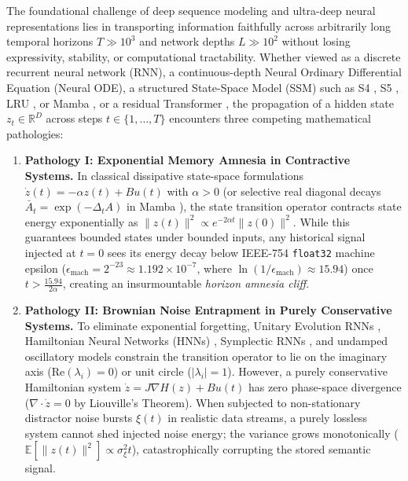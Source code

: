 \documentclass[11pt,a4paper]{article}
\begin{document}
The foundational challenge of deep sequence modeling and ultra-deep neural representations lies in transporting information faithfully across arbitrarily long temporal horizons $T \gg 10^3$ and network depths $L \gg 10^2$ without losing expressivity, stability, or computational tractability. Whether viewed as a discrete recurrent neural network (RNN), a continuous-depth Neural Ordinary Differential Equation (Neural ODE), a structured State-Space Model (SSM) such as S4 \cite{gu2022efficiently}, S5 \cite{smith2023simplified}, LRU \cite{orvieto2023resurrecting}, or Mamba \cite{gu2023mamba,dao2024transformers}, or a residual Transformer \cite{dong2021attention}, the propagation of a hidden state $z_t \in \mathbb{R}^D$ across steps $t \in \{1,\dots,T\}$ encounters three competing mathematical pathologies:

\begin{enumerate}
    \item \textbf{Pathology I: Exponential Memory Amnesia in Contractive Systems.}
    In classical dissipative state-space formulations $\dot{z}(t) = -\alpha z(t) + B u(t)$ with $\alpha > 0$ (or selective real diagonal decays $\bar{A}_t = \exp(-\Delta_t A)$ in Mamba \cite{gu2023mamba}), the state transition operator contracts state energy exponentially as $\|z(t)\|^2 \propto e^{-2\alpha t}\|z(0)\|^2$. While this guarantees bounded states under bounded inputs, any historical signal injected at $t=0$ sees its energy decay below IEEE-754 \texttt{float32} machine epsilon ($\epsilon_{\text{mach}} = 2^{-23} \approx 1.192\times 10^{-7}$, where $\ln(1/\epsilon_{\text{mach}}) \approx 15.94$) once $t > \frac{15.94}{2\alpha}$, creating an insurmountable \textit{horizon amnesia cliff}.
    
    \item \textbf{Pathology II: Brownian Noise Entrapment in Purely Conservative Systems.}
    To eliminate exponential forgetting, Unitary Evolution RNNs \cite{arjovsky2016unitary,helfrich2018orthogonal,lezcanocasado2019cheap}, Hamiltonian Neural Networks (HNNs) \cite{greydanus2019hamiltonian}, Symplectic RNNs \cite{chen2020symplectic}, and undamped oscillatory models \cite{rusch2024oscillatory} constrain the transition operator to lie on the imaginary axis ($\mathrm{Re}(\lambda_i) = 0$) or unit circle ($|\lambda_i| = 1$). However, a purely conservative Hamiltonian system $\dot{z} = J\nabla H(z) + B u(t)$ has zero phase-space divergence ($\nabla \cdot \dot{z} = 0$ by Liouville's Theorem). When subjected to non-stationary distractor noise bursts $\xi(t)$ in realistic data streams, a purely lossless system cannot shed injected noise energy; the variance grows monotonically ($\mathbb{E}[\|z(t)\|^2] \propto \sigma_\xi^2 t$), catastrophically corrupting the stored semantic signal.
    

\end{enumerate}
\end{document}
